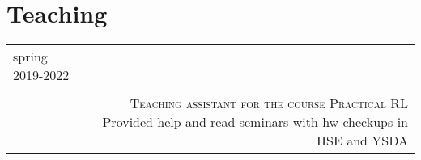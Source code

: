 \section*{Teaching}
\begin{tabular}{@{}L!{\VRule}R}
    spring 2019-2022                                                                                                       \\ {} \\ &
    {\textsc{Teaching assistant for the course Practical RL}} Provided help and read seminars with hw checkups in HSE and YSDA \\
\end{tabular}
